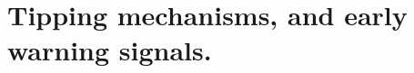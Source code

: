 %
%



\chapter{Tipping mechanisms, and early warning signals.}
\label{ch: ews}
%













\newpage

%


%
%
%
